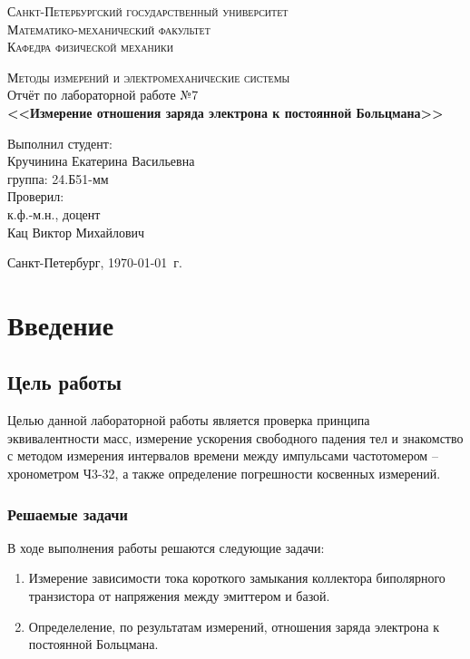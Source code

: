 \documentclass[a4paper,14pt]{extarticle}
\theoremstyle{plain}
\theoremstyle{remark}
\theoremstyle{definition}
\begin{document}
\begin{titlepage}
\begin{center}
\textsc{Санкт-Петербургский государственный университет\\
Математико-механический факультет\\
Кафедра физической механики\\}

\vfill

\textsc{Методы измерений и электромеханические системы\\[3mm]}
Отчёт по лабораторной работе №7\\[6mm]


\textbf{\large<<Измерение отношения заряда электрона к постоянной Больцмана>>}

\vfill
\end{center}

\hfill
\begin{minipage}{.5\textwidth}
Выполнил студент:\\[2mm] 
Кручинина Екатерина Васильевна\\
группа: 24.Б51-мм\\[5mm]

Проверил:\\[2mm] 
к.ф.-м.н., доцент\\
Кац Виктор Михайлович
\end{minipage}%
\vfill
\begin{center}
 Санкт-Петербург, \yeardate\today\ г.
\end{center}
\end{titlepage}
\tableofcontents
\newpage
\section{Введение}
\subsection{Цель работы}
Целью данной лабораторной работы является проверка принципа эквивалентности масс, измерение ускорения свободного падения тел и
знакомство с методом измерения интервалов времени между импульсами
частотомером – хронометром Ч3-32, а также определение погрешности косвенных измерений.

\subsubsection{Решаемые задачи}
В ходе выполнения работы решаются следующие задачи:
\begin{enumerate}
    \item Измерение зависимости тока короткого замыкания коллектора биполярного транзистора от напряжения между эмиттером и базой.
    \item Определеление, по результатам измерений, отношения заряда электрона к постоянной Больцмана.
\end{enumerate}
\end{document}
